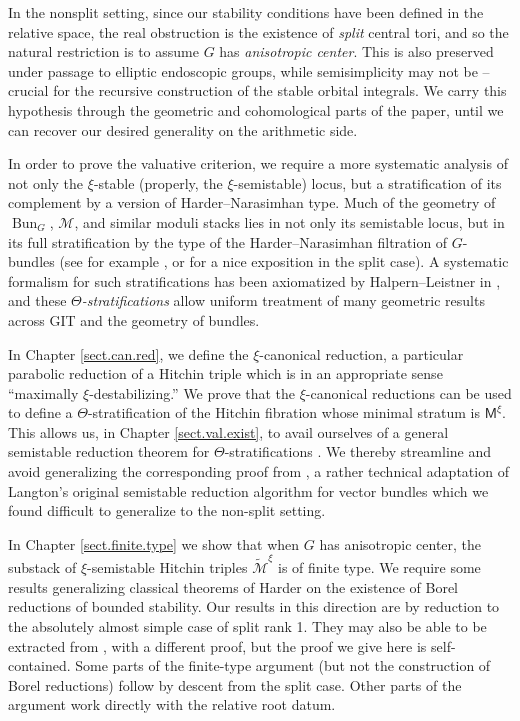 \documentclass[openany]{amsbook}
\theoremstyle{definition}
\theoremstyle{remark}
\numberwithin{equation}{section}
\newcommand{\cM}{\mathcal{M}}
\renewcommand{\-}{\operatorname{-}}
\newcommand{\on}[1]{\operatorname{#1}}
\newcommand{\ctM}{\widetilde{\cM}}
\newcommand{\bM}{\mathsf{M}}
\newcommand{\Bun}{\on{Bun}}
\begin{document}
In the nonsplit setting, since our stability conditions have been defined in the relative space, the real obstruction is the existence of \emph{split} central tori, and so the natural restriction is to assume $G$ has \emph{anisotropic center}. This is also preserved under passage to elliptic endoscopic groups, while semisimplicity may not be -- crucial for the recursive construction of the stable orbital integrals. We carry this hypothesis through the geometric and cohomological parts of the paper, until we can recover our desired generality on the arithmetic side.

In order to prove the valuative criterion, we require a more systematic analysis of not only the $\xi$-stable (properly, the $\xi$-semistable) locus, but a stratification of its complement by a version of Harder--Narasimhan type. Much of the geometry of $\Bun_G$, $\cM$, and similar moduli stacks lies in not only its semistable locus, but in its full stratification by the type of the Harder--Narasimhan filtration of $G$-bundles (see for example \cite{lurieweil}, or \cite{schiederHN} for a nice exposition in the split case). A systematic formalism for such stratifications has been axiomatized by Halpern--Leistner in \cite{HalpernLeistnerInstability}, and these \emph{$\Theta$-stratifications} allow uniform treatment of many geometric results across GIT and the geometry of bundles.

In Chapter \ref{sect.can.red}, we define the $\xi$-canonical reduction, a particular parabolic reduction of a Hitchin triple which is in an appropriate sense ``maximally $\xi$-destabilizing.'' 
We prove that the $\xi$-canonical reductions can be used to define a $\Theta$-stratification of the Hitchin fibration whose minimal stratum is $\bM^\xi$. This allows us, in Chapter \ref{sect.val.exist}, to avail ourselves of a general semistable reduction theorem for $\Theta$-stratifications \cite{AHLHModuliForStacks}. We thereby streamline and avoid generalizing the corresponding proof from \cite{CLI}, a rather technical adaptation of Langton's original semistable reduction algorithm for vector bundles which we found difficult to generalize to the non-split setting.

In Chapter \ref{sect.finite.type} we show that when $G$ has anisotropic center, the substack of $\xi$-semistable Hitchin triples $\ctM^\xi$ is of finite type. We require some results generalizing classical theorems of Harder on the existence of Borel reductions of bounded stability. Our results in this direction are by reduction to the absolutely almost simple case of split rank 1. They may also be able to be extracted from \cite{lurieweil}, with a different proof, but the proof we give here is self-contained. Some parts of the finite-type argument (but not the construction of Borel reductions) follow by descent from the split case. Other parts of the argument work directly with the relative root datum. 
\end{document}
